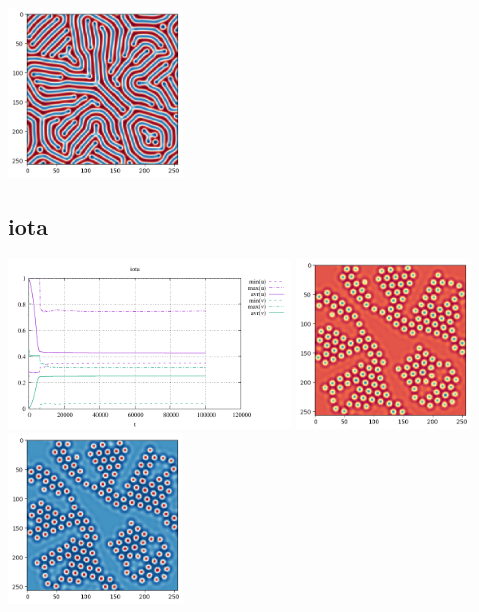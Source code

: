 \begin{center}
\includegraphics[height=4.5cm]{python_codes/fieldstone_171/results/theta2_solution_final_v.png}
\end{center}

\subsection*{iota}
\begin{center}
\includegraphics[height=4.5cm]{python_codes/fieldstone_171/results/iota_stats}
\includegraphics[height=4.5cm]{python_codes/fieldstone_171/results/iota_solution_final_u.png}
\includegraphics[height=4.5cm]{python_codes/fieldstone_171/results/iota_solution_final_v.png}
\end{center}

